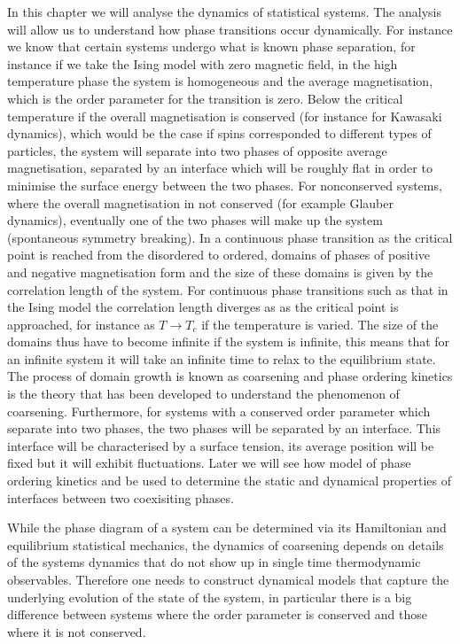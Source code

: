 In this chapter we will analyse the dynamics of statistical systems. The analysis will allow us to understand how phase transitions occur dynamically. For instance we know that certain systems undergo what is known phase separation, for instance if we take the Ising model with zero magnetic field, in the high temperature phase the system is homogeneous and the average magnetisation, which is the order parameter for the transition is zero. Below the critical temperature if the overall magnetisation is conserved (for instance for Kawasaki dynamics), which would be the case if spins corresponded to different types of particles, the system will separate into two  phases of opposite average magnetisation, separated by an interface which will be roughly flat in order to minimise the surface energy between the two phases. For nonconserved systems, where the overall magnetisation in not conserved (for example Glauber dynamics), eventually one of the two phases will make up the system (spontaneous symmetry breaking). In a continuous phase transition as the critical point is reached from the disordered to ordered, domains of phases of positive and negative magnetisation form and the size of these domains is given by the correlation length of the system. For continuous phase transitions such as that in the Ising model the correlation length diverges as as the critical point is approached, for instance as $T\to T_c$ if the temperature is varied. The size of the domains thus have to become infinite if the system is infinite, this means that for an infinite system it will take an infinite time to relax to the equilibrium state. The process of domain growth is known as coarsening and phase ordering kinetics is the theory that has been developed to understand the phenomenon of coarsening. Furthermore, for systems with a conserved order parameter which separate into two phases, the two phases will be separated by an interface. This interface will be characterised by a surface tension, its average position will be fixed but it will exhibit fluctuations. Later we will see how model of phase ordering kinetics and be used to determine the static and dynamical properties of interfaces between two coexisiting phases. 

While the phase diagram of a system can be determined via 
its Hamiltonian and equilibrium statistical mechanics, the dynamics of coarsening depends on details of the systems dynamics that do not show up in single time thermodynamic observables. Therefore one needs to construct dynamical models that capture the underlying evolution of the state of the system, in particular there is a big difference between systems where the order parameter is conserved and those where it is not conserved.

